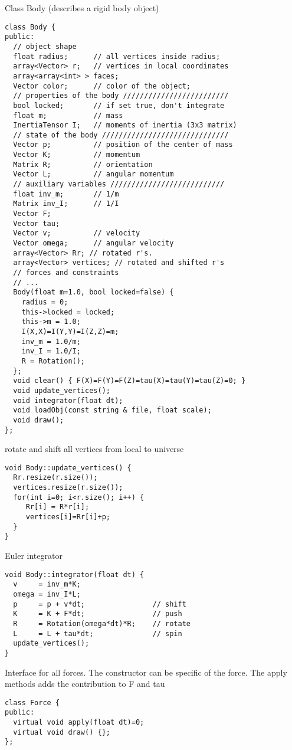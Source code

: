 Class Body (describes a rigid body object)
\begin{lstlisting}
class Body {
public:
  // object shape
  float radius;      // all vertices inside radius;
  array<Vector> r;   // vertices in local coordinates
  array<array<int> > faces;
  Vector color;      // color of the object; 
  // properties of the body /////////////////////////
  bool locked;       // if set true, don't integrate
  float m;           // mass
  InertiaTensor I;   // moments of inertia (3x3 matrix)
  // state of the body //////////////////////////////
  Vector p;          // position of the center of mass
  Vector K;          // momentum
  Matrix R;          // orientation
  Vector L;          // angular momentum
  // auxiliary variables ///////////////////////////
  float inv_m;       // 1/m
  Matrix inv_I;      // 1/I
  Vector F;
  Vector tau;
  Vector v;          // velocity
  Vector omega;      // angular velocity
  array<Vector> Rr; // rotated r's.
  array<Vector> vertices; // rotated and shifted r's
  // forces and constraints
  // ...
  Body(float m=1.0, bool locked=false) {
    radius = 0;
    this->locked = locked;
    this->m = 1.0;
    I(X,X)=I(Y,Y)=I(Z,Z)=m;
    inv_m = 1.0/m;
    inv_I = 1.0/I;
    R = Rotation();
  };
  void clear() { F(X)=F(Y)=F(Z)=tau(X)=tau(Y)=tau(Z)=0; }
  void update_vertices();
  void integrator(float dt);
  void loadObj(const string & file, float scale);
  void draw();
};
\end{lstlisting}

rotate and shift all vertices from local to universe
\begin{lstlisting}
void Body::update_vertices() {
  Rr.resize(r.size());
  vertices.resize(r.size());
  for(int i=0; i<r.size(); i++) {
     Rr[i] = R*r[i];
     vertices[i]=Rr[i]+p;
  }
}
\end{lstlisting}

Euler integrator
\begin{lstlisting}
void Body::integrator(float dt) {
  v     = inv_m*K;
  omega = inv_I*L;
  p     = p + v*dt;                // shift
  K     = K + F*dt;                // push
  R     = Rotation(omega*dt)*R;    // rotate
  L     = L + tau*dt;              // spin
  update_vertices();
}
\end{lstlisting}

Interface for all forces.
The constructor can be specific of the force.
The apply methods adds the contribution to F and tau
\begin{lstlisting}
class Force {
public:
  virtual void apply(float dt)=0;
  virtual void draw() {};
};
\end{lstlisting}

